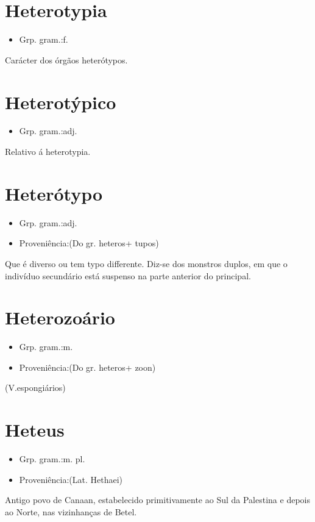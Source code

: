 \documentclass{article}
\begin{document}
\section{Heterotypia}
\begin{itemize}
\item {Grp. gram.:f.}
\end{itemize}
Carácter dos órgãos heterótypos.
\section{Heterotýpico}
\begin{itemize}
\item {Grp. gram.:adj.}
\end{itemize}
Relativo á heterotypia.
\section{Heterótypo}
\begin{itemize}
\item {Grp. gram.:adj.}
\end{itemize}
\begin{itemize}
\item {Proveniência:(Do gr. \textunderscore heteros\textunderscore  + \textunderscore tupos\textunderscore )}
\end{itemize}
Que é diverso ou tem typo differente.
Diz-se dos monstros duplos, em que o indivíduo secundário está suspenso na parte anterior do principal.
\section{Heterozoário}
\begin{itemize}
\item {Grp. gram.:m.}
\end{itemize}
\begin{itemize}
\item {Proveniência:(Do gr. \textunderscore heteros\textunderscore  + \textunderscore zoon\textunderscore )}
\end{itemize}
(V.espongiários)
\section{Heteus}
\begin{itemize}
\item {Grp. gram.:m. pl.}
\end{itemize}
\begin{itemize}
\item {Proveniência:(Lat. \textunderscore Hethaei\textunderscore )}
\end{itemize}
Antigo povo de Canaan, estabelecido primitivamente ao Sul da Palestina e depois ao Norte, nas vizinhanças de Betel.
\end{document}
